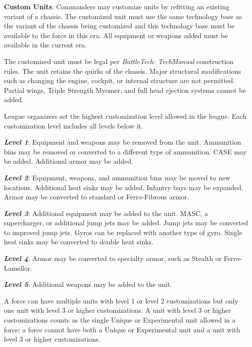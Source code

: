 \item {\bfseries Custom Units}: Commanders may customize units by refitting an existing variant of a chassis.
The customized unit must use the same technology base as the variant of the chassis being customized and this technology base must be available to the force in this era.
All equipment or weapons added must be available in the current era.

The customized unit must be legal per \emph{BattleTech: TechManual} construction rules.
The unit retains the quirks of the chassis.
Major structural modifications such as changing the engine, cockpit, or internal structure are not permitted.
Partial wings, Triple Strength Myomer, and full head ejection systems cannot be added.

League organizers set the highest customization level allowed in the league.
Each customization level includes all levels below it.

\begin{description}

\item \emph{\bfseries Level 1}: Equipment and weapons may be removed from the unit.
Ammunition bins may be removed or converted to a different type of ammunition.
CASE may be added.
Additional armor may be added.

\item \emph{\bfseries Level 2}: Equipment, weapons, and ammunition bins may be moved to new locations.
Additional heat sinks may be added.
Infantry bays may be expanded.
Armor may be converted to standard or Ferro-Fibrous armor.

\item \emph{\bfseries Level 3}: Additional equipment may be added to the unit. 
MASC, a supercharger, or additional jump jets may be added.
Jump jets may be converted to improved jump jets.
Gyros can be replaced with another type of gyro.
Single heat sinks may be converted to double heat sinks.

\item \emph{\bfseries Level 4}: Armor may be converted to specialty armor, such as Stealth or Ferro-Lamellor.

\item \emph{\bfseries Level 5}: Additional weapons may be added to the unit.

\end{description}

A force can have multiple units with level 1 or level 2 customizations but only one unit with level 3 or higher customizations.
A unit with level 3 or higher customizations counts as the single Unique or Experimental unit allowed in a force; a force cannot have both a Unique or Experimental unit and a unit with level 3 or higher customizations.

